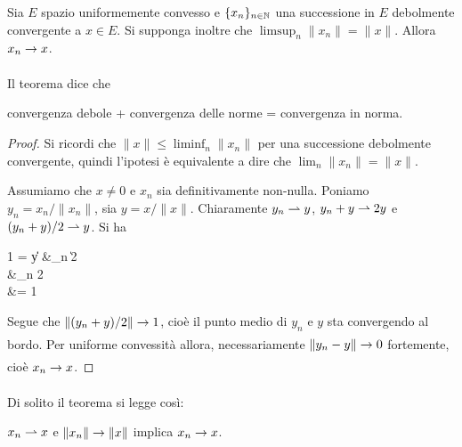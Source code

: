 \begin{theorem}
\label{th:weaktop_seventeen}
	Sia $E$ spazio uniformemente convesso e $\{x_n\}_{n \in \mathbb{N}}$ una successione in $E$ debolmente convergente a $x \in E$. Si supponga inoltre che $\limsup_n \|x_n\| = \|x\|$.
	Allora $x_n \underset{{}}{\rightarrow} x$.
\end{theorem}
\begin{remark}
	Il teorema dice che
	\begin{center}
		convergenza debole + convergenza delle norme = convergenza in norma.
	\end{center}
\end{remark}
\begin{proof}
	Si ricordi che $\|x\| \leq \liminf_n \|x_n\|$ per una successione debolmente convergente, quindi l'ipotesi è equivalente a dire che $\lim_n \|x_n\| = \|x\|$.

	Assumiamo che $x \neq 0$ e $x_n$ sia definitivamente non-nulla. Poniamo $y_n = x_n/\|x_n\|$, sia $y = x/\|x\|$. Chiaramente $y_n \rightharpoonup y$, $y_n + y \rightharpoonup 2y$ e $(y_n+y)/2 \rightharpoonup y$. Si ha
	\begin{eqalign*}
		1 = \|y\| &\leq \liminf_n \left\|2\right\|\\[.7ex]
			&\leq \limsup_n 2\\
			&= 1
	\end{eqalign*}
	Segue che $\|(y_n+y)/2\| \underset{{}}{\rightarrow} 1$, cioè il punto medio di $y_n$ e $y$ sta convergendo al bordo. Per uniforme convessità allora, necessariamente $\|y_n - y\| \underset{{}}{\rightarrow} 0$ fortemente, cioè $x_n \underset{{}}{\rightarrow} x$.
\end{proof}

Di solito il teorema si legge così:
\begin{center}
	$x_n \rightharpoonup x$ e $\|x_n\| \underset{{}}{\rightarrow} \|x\|$ implica $x_n \underset{{}}{\rightarrow} x$.
\end{center}
